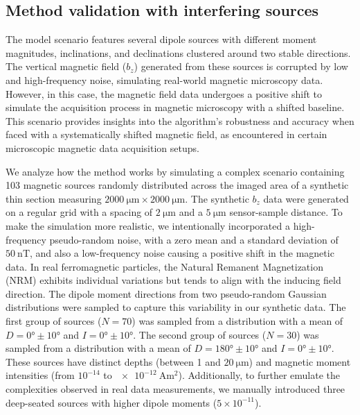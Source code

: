 \subsection{Method validation with interfering sources}

The model scenario features several dipole sources with different moment magnitudes, inclinations, and declinations clustered around two stable directions. The vertical magnetic field ($b_z$) generated from these sources is corrupted by low and high-frequency noise, simulating real-world magnetic microscopy data. However, in this case, the magnetic field data undergoes a positive shift to simulate the acquisition process in magnetic microscopy with a shifted baseline. This scenario provides insights into the algorithm's robustness and accuracy when faced with a systematically shifted magnetic field, as encountered in certain microscopic magnetic data acquisition setups.

We analyze how the method works by simulating a complex scenario containing 103 magnetic sources randomly distributed across the imaged area of a synthetic thin section measuring $\qty{2000}{\um} \times \qty{2000}{\um}$. The synthetic $b_z$ data were generated on a regular grid with a spacing of $\qty{2}{\um}$ and a $\qty{5}{\um}$ sensor-sample distance. To make the simulation more realistic, we intentionally incorporated a high-frequency pseudo-random noise, with a zero mean and a standard deviation of $\qty{50}{\nano\tesla}$, and also a low-frequency noise causing a positive shift in the magnetic data. In real ferromagnetic particles, the Natural Remanent Magnetization (NRM) exhibits individual variations but tends to align with the inducing field direction. The dipole moment directions from two pseudo-random Gaussian distributions were sampled to capture this variability in our synthetic data. The first group of sources ($N = 70$) was sampled from a distribution with a mean of $D = \ang{0}\pm\ang{10}$ and $I = \ang{0}\pm\ang{10}$. The second group of sources ($N = 30$) was sampled from a distribution with a mean of $D = \ang{180}\pm\ang{10}$ and $I = \ang{0}\pm\ang{10}$. These sources have distinct depths (between 1 and $\qty{20}{\um}$) and magnetic moment intensities (from $10^{-14}$ to $\qty{e-12}{\ampere\m\squared}$). Additionally, to further emulate the complexities observed in real data measurements, we manually introduced three deep-seated sources with higher dipole moments ($5 \times 10^{-11}$). 


